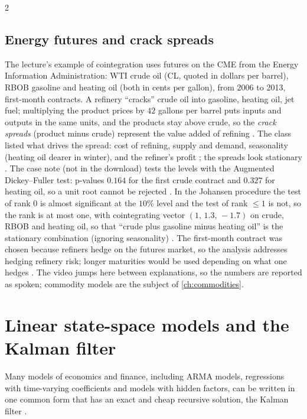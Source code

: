 \begin{paracol}{2}
\subsection{Energy futures and crack spreads}\label{ch09:sec-crack}
The lecture's example of cointegration uses futures on the CME from the Energy Information Administration: WTI crude oil (CL, quoted in dollars per barrel), RBOB
gasoline and heating oil (both in cents per gallon), from 2006 to 2013, first-month contracts. A refinery ``cracks'' crude oil into gasoline, heating oil, jet fuel;
multiplying the product prices by $42$ gallons per barrel puts inputs and outputs in the same units, and the products stay above crude, so the
\emph{crack spreads} (product minus crude) represent the value added of refining . The class
listed what drives the spread: cost of refining, supply and demand, seasonality (heating oil dearer in winter), and the refiner's profit
; the spreads look stationary . The case note (not in the download) tests the levels with the Augmented Dickey--Fuller test:
p-values $0.164$ for the first crude contract and $0.327$ for heating oil, so a unit root cannot be rejected . In the Johansen
procedure the test of rank $0$ is almost significant at the $10\%$ level and the test of rank $\le1$ is not, so the rank is at most one, with cointegrating vector $(1,\,1.3,\,-1.7)$ on crude, RBOB and heating oil, so that
``crude plus gasoline minus heating oil'' is the stationary combination (ignoring seasonality) . The first-month contract was chosen because
refiners hedge on the futures market, so the analysis addresses hedging refinery risk; longer maturities would be used depending on what one hedges .
The video jumps here between explanations, so the numbers are reported as spoken; commodity models are the subject of \cref{ch:commodities}.

\section{Linear state-space models and the Kalman filter}\label{ch09:sec-ss}

Many models of economics and finance, including ARMA models, regressions with time-varying coefficients and models with hidden factors, can be written in
one common form that has an exact and cheap recursive solution, the Kalman filter .


\end{paracol}
